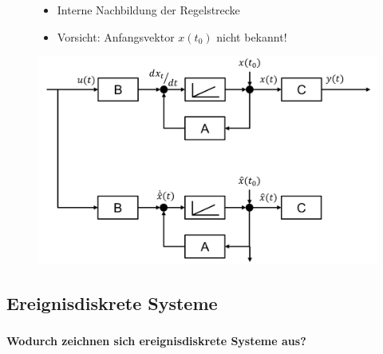 \begin{figure}[H]
    \centering
    \begin{minipage}{.45\linewidth}
        \begin{itemize}
            \item Interne Nachbildung der Regelstrecke
            \item Vorsicht: Anfangsvektor $x(t_0)$ nicht bekannt!
        \end{itemize}
    \end{minipage}
    \begin{minipage}{.5\linewidth}
        \centering
        \includegraphics[width=.99\linewidth]{Graphics/Beobachter_Grundidee.png}
    \end{minipage}
\end{figure}

\subsection{Ereignisdiskrete Systeme}
\subsubsection{}
\textbf{Wodurch zeichnen sich ereignisdiskrete Systeme aus?}

